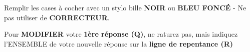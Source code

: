 \documentclass[oneside,12pt]{article}
\begin{document}
Remplir les cases à cocher avec un stylo bille \textbf{NOIR} ou \textbf{BLEU FONCÉ} - Ne pas utiliser de \textbf{CORRECTEUR}.

Pour \textbf{MODIFIER} votre \textbf{1ère réponse (Q)}, ne raturez pas, mais indiquez l’ENSEMBLE de votre nouvelle réponse sur la \textbf{ligne de repentance (R)}


\vspace{1cm}

\begin{center}

  

  

  

 

\end{center}
\end{document}
